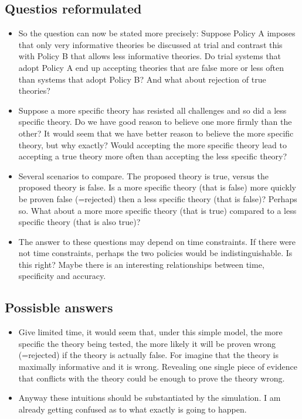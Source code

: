 \documentclass[
  11pt,
  dvipsnames,enabledeprecatedfontcommands]{scrartcl}
\begin{document}
\hypertarget{questios-reformulated}{%
\subsection{Questios reformulated}\label{questios-reformulated}}

\begin{itemize}
\item
  So the question can now be stated more precisely: Suppose Policy A
  imposes that only very informative theories be discussed at trial and
  contrast this with Policy B that allows less informative theories. Do
  trial systems that adopt Policy A end up accepting theories that are
  false more or less often than systems that adopt Policy B? And what
  about rejection of true theories?
\item
  Suppose a more specific theory has resisted all challenges and so did
  a less specific theory. Do we have good reason to believe one more
  firmly than the other? It would seem that we have better reason to
  believe the more specific theory, but why exactly? Would accepting the
  more specific theory lead to accepting a true theory more often than
  accepting the less specific theory?
\item
  Several scenarios to compare. The proposed theory is true, versus the
  proposed theory is false. Is a more specific theory (that is false)
  more quickly be proven false (=rejected) then a less specific theory
  (that is false)? Perhaps so. What about a more more specific theory
  (that is true) compared to a less specific theory (that is also true)?
\item
  The answer to these questions may depend on time constraints. If there
  were not time constraints, perhaps the two policies would be
  indistinguishable. Is this right? Maybe there is an interesting
  relationships between time, specificity and accuracy.
\end{itemize}

\hypertarget{possisble-answers}{%
\subsection{Possisble answers}\label{possisble-answers}}

\begin{itemize}
\item
  Give limited time, it would seem that, under this simple model, the
  more specific the theory being tested, the more likely it will be
  proven wrong (=rejected) if the theory is actually false. For imagine
  that the theory is maximally informative and it is wrong. Revealing
  one single piece of evidence that conflicts with the theory could be
  enough to prove the theory wrong.
\item
  Anyway these intuitions should be substantiated by the simulation. I
  am already getting confused as to what exactly is going to happen.
\end{itemize}
\end{document}
